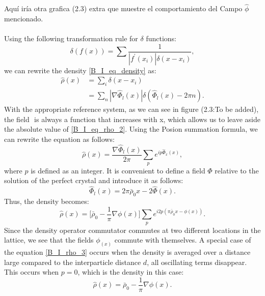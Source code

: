 \textcolor{myred}{Aquí iría otra grafica (2.3) extra que muestre el comportamiento del Campo $\hat{\phi}$ mencionado. } \\ \\
Using the following transformation rule for $\delta$ functions:
\begin{equation} \label{2_3_4}
    \delta(f(x)) = \sum \frac{1}{|f^{\prime}(x_{i})| \delta(x-x_{i})} ,
\end{equation}
we can rewrite the density \eqref{B_I_eq_density} as:
\begin{equation} \label{B_I_eq_rho_2}
    \begin{aligned} 
            \hat{\rho}(x) &=\sum_{i} \delta(x-x_{i}) \\
               &= \sum_{n} | \nabla \hat{ \Phi}_{l}(x)| \delta( \hat{\Phi}_{l}(x)-2\pi n). 
    \end{aligned}
\end{equation}
With the appropriate reference system, as we can see in figure (2.3:To be added), the field $ $ is always a function that increases with x, which allows us to leave aside the absolute value of \eqref{B_I_eq_rho_2}. Using the Posion summation formula, we can rewrite the equation as follows:
\begin{equation} \label{2_3_6}
    \hat{\rho} (x) = \frac{\nabla \hat{\Phi}_{l}(x)}{2\pi} \sum_{p} e^{ip \hat{\Phi}_{x}(x)},
\end{equation}
where $p$ is defined as an integer. It is convenient to define a field $\hat{\Phi}$ relative to the solution of the perfect crystal and introduce it as follows:
\begin{equation} \label{2_3_7}
    \hat{\Phi}_{l}(x) =2\pi \bar{\rho}_{0}x -2 \hat{\Phi}(x). 
\end{equation}
Thus, the density becomes:
\begin{equation} \label{B_I_rho_3}
    \hat{\rho}(x) = \big[\bar{\rho}_{0}-\frac{1}{\pi} \nabla \phi(x
)   \big] \sum_{p} e^{i2p(\pi \bar{\rho}_{0}x - \phi(x
))}.
\end{equation}
Since the density operator commutator commutes at two different locations in the lattice, we see that the fields $\phi_(x)$ commute with themselves. A special case of the equation \eqref{B_I_rho_3} occurs when the density is averaged over a distance large compared to the interparticle distance $d$, all oscillating terms disappear. This occurs when $p=0$, which is the density in this case:
\begin{equation} \label{2_3_8}
    \hat{\rho}(x) = \bar{\rho}_{0}-\frac{1}{\pi} \nabla \phi(x
).   
\end{equation}
